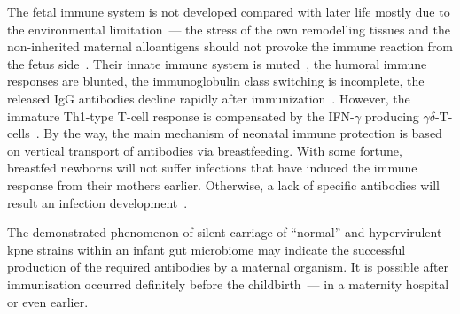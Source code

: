 The fetal immune system is not developed compared with later life mostly due to the environmental limitation~---
the stress of the own remodelling tissues and the non-inherited maternal alloantigens should not provoke
the immune reaction from the fetus side~\cite{Simon2015}.
Their innate immune system is muted~\cite{Haase2010}, the humoral immune responses are blunted,
the immunoglobulin class switching is incomplete, the released IgG antibodies decline rapidly after
immunization~\cite{Pihlgren2006}.
However, the immature Th1-type T-cell response is compensated by the IFN-$\gamma$ producing
$\gamma\delta$-T-cells~\cite{Gibbons2009}.
By the way, the main mechanism of neonatal immune protection is based on vertical transport of antibodies
via breastfeeding.
With some fortune, breastfed newborns will not suffer infections that have induced the immune response
from their mothers earlier.
Otherwise, a lack of specific antibodies will result an infection development~\cite{Dias2017}.

The demonstrated phenomenon of silent carriage of ``normal'' and hypervirulent \gls{kpne} strains within an
infant gut microbiome may indicate the successful production of the required antibodies by a maternal organism.
It is possible after immunisation occurred definitely before the childbirth~--- in a maternity hospital or even earlier.
